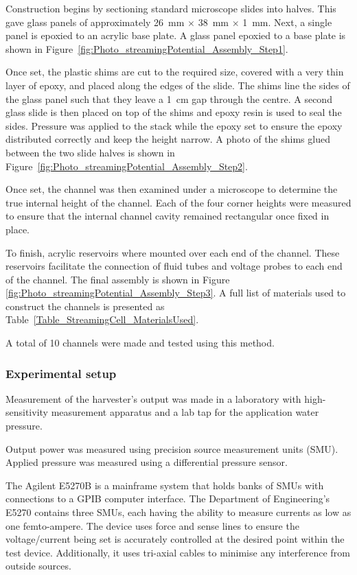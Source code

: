     Construction begins by sectioning standard microscope slides into halves.
    This gave glass panels of approximately \SI{26}{\milli\meter} $\times$ \SI{38}{\milli\meter} $\times$ \SI{1}{\milli\meter}.
    Next, a single panel is epoxied to an acrylic base plate.
    A glass panel epoxied to a base plate is shown in Figure~\ref{fig:Photo_streamingPotential_Assembly_Step1}.

    Once set, the plastic shims are cut to the required size, covered with a very thin layer of epoxy, and placed along the edges of the slide.
    The shims line the sides of the glass panel such that they leave a \SI{1}{\centi\meter} gap through the centre.
    A second glass slide is then placed on top of the shims and epoxy resin is used to seal the sides.
    Pressure was applied to the stack while the epoxy set to ensure the epoxy distributed correctly and keep the height narrow.
    A photo of the shims glued between the two slide halves is shown in Figure~\ref{fig:Photo_streamingPotential_Assembly_Step2}.

    Once set, the channel was then examined under a microscope to determine the true internal height of the channel.
    Each of the four corner heights were measured to ensure that the internal channel cavity remained rectangular once fixed in place.

    To finish, acrylic reservoirs where mounted over each end of the channel.
    These reservoirs facilitate the connection of fluid tubes and voltage probes to each end of the channel.
    The final assembly is shown in Figure \ref{fig:Photo_streamingPotential_Assembly_Step3}.
    A full list of materials used to construct the channels is presented as Table~\ref{Table_StreamingCell_MaterialsUsed}.

    A total of 10 channels were made and tested using this method.

  \subsubsection*{Experimental setup}

    Measurement of the harvester's output was made in a laboratory with high-sensitivity measurement apparatus and a lab tap for the application water pressure.

    Output power was measured using precision source measurement units (SMU).
    Applied pressure was measured using a differential pressure sensor.

    The Agilent E5270B is a mainframe system that holds banks of SMUs with connections to a GPIB computer interface.
    The Department of Engineering's E5270 contains three SMUs, each having the ability to measure currents as low as one femto-ampere.
    The device uses force and sense lines to ensure the voltage/current being set is accurately controlled at the desired point within the test device.
    Additionally, it uses tri-axial cables to minimise any interference from outside sources.

